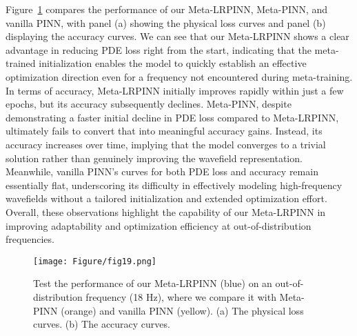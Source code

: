 Figure~\ref{fig19} compares the performance of our Meta-LRPINN, Meta-PINN, and vanilla PINN, with panel (a) showing the physical loss curves and panel (b) displaying the accuracy curves. We can see that our Meta-LRPINN shows a clear advantage in reducing PDE loss right from the start, indicating that the meta-trained initialization enables the model to quickly establish an effective optimization direction even for a frequency not encountered during meta-training. In terms of accuracy, Meta-LRPINN initially improves rapidly within just a few epochs, but its accuracy subsequently declines. Meta-PINN, despite demonstrating a faster initial decline in PDE loss compared to Meta-LRPINN, ultimately fails to convert that into meaningful accuracy gains. Instead, its accuracy increases over time, implying that the model converges to a trivial solution rather than genuinely improving the wavefield representation. Meanwhile, vanilla PINN’s curves for both PDE loss and accuracy remain essentially flat, underscoring its difficulty in effectively modeling high-frequency wavefields without a tailored initialization and extended optimization effort. Overall, these observations highlight the capability of our Meta-LRPINN in improving adaptability and optimization efficiency at out-of-distribution frequencies.


\begin{figure}[htbp]
\centering
\texttt{[image: Figure/fig19.png]}
\caption{Test the performance of our Meta-LRPINN (blue) on an out-of-distribution frequency (18 Hz), where we compare it with Meta-PINN (orange) and vanilla PINN (yellow). (a) The physical loss curves. (b) The accuracy curves.}
\label{fig19}
\end{figure}



